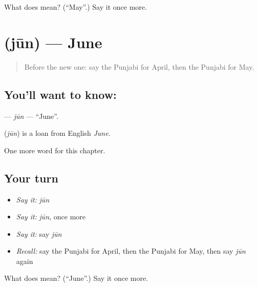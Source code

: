 \begin{tcolorbox}[breakable,colback=teal!4,colframe=teal!35!black,title={Before you move on}]
What does  mean? (\textquotedblleft{}May\textquotedblright{}.) Say it once more.
\end{tcolorbox}
\section[\texorpdfstring{\pa{ਜੂਨ} (jūn)}{ਜੂਨ (jūn)}]{ (jūn) — June}

\label{lesson:PA-C102-jun}



\begin{quote}
Before the new one: say the Punjabi for April, then the Punjabi for May.
\end{quote}

\subsection*{You'll want to know: }
\textbf{} — \emph{jūn} — \textquotedblleft{}June\textquotedblright{}.

\begin{cousinweb}
\textbf{} (\emph{jūn}) is a loan from English \emph{June}.
\end{cousinweb}

\begin{grammarlens}[title={What you've built}]
One more word for this chapter.
\end{grammarlens}

\subsection*{Your turn}
\begin{itemize}
\raggedright
  \item \emph{Say it:} \emph{jūn}
  \item \emph{Say it:} \emph{jūn}, once more
  \item \emph{Say it:} say \emph{jūn}
  \item \emph{Recall:} say the Punjabi for April, then the Punjabi for May, then say \emph{jūn} again
\end{itemize}

\begin{tcolorbox}[breakable,colback=teal!4,colframe=teal!35!black,title={Before you move on}]
What does  mean? (\textquotedblleft{}June\textquotedblright{}.) Say it once more.
\end{tcolorbox}
